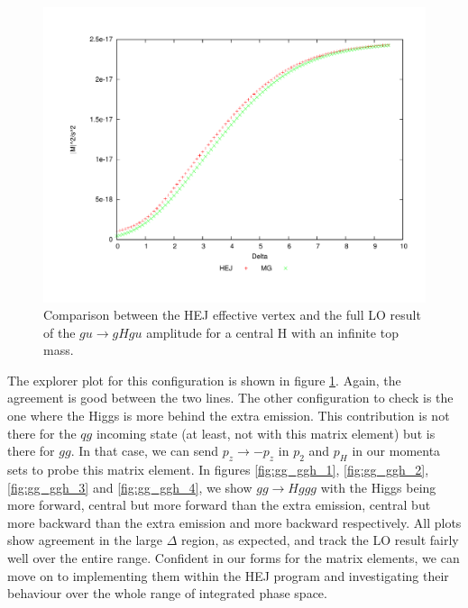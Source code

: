 \begin{figure}[t]
\centering
\includegraphics[scale=0.5]{Images/ug_cen.pdf}
\caption{Comparison between the HEJ effective vertex and the full LO result of the $gu \to gHgu$ amplitude for a central H with an infinite top mass.}
\label{fig:ug_cen}
\end{figure}


The explorer plot for this configuration is shown in figure \ref{fig:ug_cen}. Again, the agreement is good between the two lines. The other configuration to check is the one where the Higgs is more behind the extra emission. This contribution is not there for the $qg$ incoming state (at least, not with this matrix element) but is there for $gg$.  In that case, we can send $p_z \to -p_z$ in $p_2$ and $p_H$ in our momenta sets to probe this matrix element. In figures \ref{fig:gg_ggh_1}, \ref{fig:gg_ggh_2}, \ref{fig:gg_ggh_3} and \ref{fig:gg_ggh_4}, we show $gg \to Hggg$ with the Higgs being more forward, central but more forward than the extra emission, central but more backward than the extra emission and more backward respectively. All plots show agreement in the large $\Delta$ region, as expected, and track the LO result fairly well over the entire range. Confident in our forms for the matrix elements, we can move on to implementing them within the HEJ program and investigating their behaviour over the whole range of integrated phase space.

